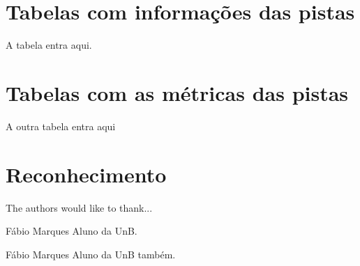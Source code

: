 \documentclass[journal]{IEEEtran}
\begin{document}
\appendices
\section{Tabelas com informações das pistas}
A tabela entra aqui.

\section{Tabelas com as métricas das pistas}
A outra tabela entra aqui


\section*{Reconhecimento}


The authors would like to thank...


% 

\begin{IEEEbiography}{Fábio Marques}
Aluno da UnB.
\end{IEEEbiography}

\begin{IEEEbiographynophoto}{Fábio Marques}
Aluno da UnB também.
\end{IEEEbiographynophoto}








{}

\end{document}
